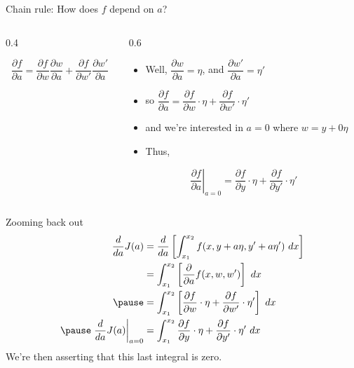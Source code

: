 \documentclass[handout]{beamer}
\begin{document}
\begin{frame}{Chain rule: How does $f$ depend on $a$?}
\begin{columns}
\begin{column}{0.4\textwidth}
\begin{center}
    \end{center} \pause
    
    \[\dfrac{\partial f}{\partial a} = 
      \dfrac{\partial f}{\partial w}
      \dfrac{\partial w}{\partial a} +
      \dfrac{\partial f}{\partial w'}
      \dfrac{\partial w'}{\partial a} \] \pause
\end{column}
\vrule{}
\begin{column}{0.6\textwidth}
\begin{itemize}
\item Well, $\dfrac{\partial w}{\partial a} = \eta$, and $\dfrac{\partial w'}{\partial a} = \eta'$ \pause

\item so $ \dfrac{\partial f}{\partial a} = 
      \dfrac{\partial f}{\partial w}
      \cdot \eta +
      \dfrac{\partial f}{\partial w'}
      \cdot \eta' $ \pause
\item and we're interested in $a=0$ where $w=y+0\eta$ \pause
\item Thus,
\end{itemize}

\[ \left.\dfrac{\partial f}{\partial a} \right|_{a=0} = 
      \dfrac{\partial f}{\partial y}
      \cdot \eta +
      \dfrac{\partial f}{\partial y'}
      \cdot \eta' \]
\end{column}
\end{columns}
\end{frame}

\begin{frame}{Zooming back out}
    \begin{align*}
        \dfrac{d}{da} J(a) &= \dfrac{d}{da} \left[\int_{x_1}^{x_2}f(x, y+a\eta, y'+a\eta')\ dx\right] \\
        &= \int_{x_1}^{x_2} \left[\dfrac{\partial}{\partial a} f(x, w, w') \right]\ dx \\ \pause
        &= \int_{x_1}^{x_2} \left[
            \dfrac{\partial f}{\partial w}  \cdot \eta +
            \dfrac{\partial f}{\partial w'} \cdot \eta'
            \right]\ dx \\ \pause
        \left. \dfrac{d}{da} J(a) \right|_{a=0} &= 
            \int_{x_1}^{x_2} \dfrac{\partial f}{\partial y} \cdot \eta +
            \dfrac{\partial f}{\partial y'} \cdot \eta' \ dx 
    \end{align*}
    We're then asserting that this last integral is zero.
\end{frame}
\end{document}
